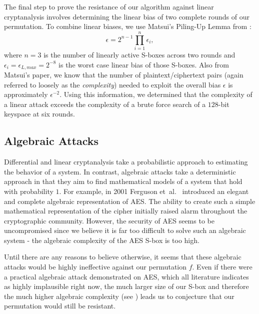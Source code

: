 The final step to prove the resistance of our algorithm against linear cryptanalysis involves determining the linear bias of two complete rounds of our permutation.
To combine linear biases, we use Matsui's Piling-Up Lemma from \cite{Matsui1993_Linear}:
\begin{equation*}
\epsilon = 2^{n-1} \prod\limits_{i = 1}^n \epsilon_i,
\end{equation*}
where $n = 3$ is the number of linearly active S-boxes across two rounds and $\epsilon_i = \epsilon_{L,max} = 2^{-8}$ is the worst case linear bias of those S-boxes.
Also from Matsui's paper, we know that the number of plaintext/ciphertext pairs (again referred to loosely as the \emph{complexity}) needed to exploit the overall bias $\epsilon$ is approximately $\epsilon^{-2}$.
Using this information, we determined that the complexity of a linear attack exceeds the complexity of a brute force search of a $128$-bit keyspace at six rounds.

\subsection{Algebraic Attacks}
Differential and linear cryptanalysis take a probabilistic approach to estimating the behavior of a system.
In contrast, algebraic attacks take a deterministic approach in that they aim to find mathematical models of a system that hold with probability $1$.
For example, in 2001 Ferguson et~al.\ \cite{Ferguson2001_AlgebraicRijndael} introduced an elegant and complete algebraic representation of AES.
The ability to create such a simple mathematical representation of the cipher initially raised alarm throughout the cryptographic community.
However, the security of AES seems to be uncompromised since we believe it is far too difficult to solve such an algebraic system - the algebraic complexity of the AES S-box is too high.

Until there are any reasons to believe otherwise, it seems that these algebraic attacks would be highly ineffective against our permutation $f$.
Even if there were a practical algebraic attack demonstrated on AES, which all literature indicates as highly implausible right now, the much larger size of our S-box and therefore the much higher algebraic complexity (see \cite{Wood2013_SboxThesis}) leads us to conjecture that our permutation would still be resistant.

